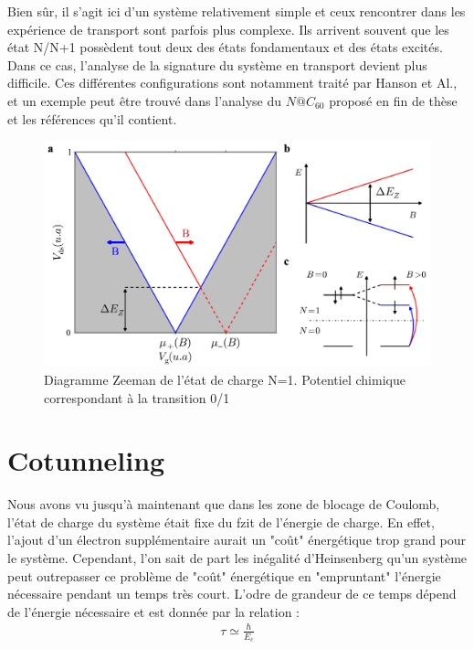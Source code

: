  Bien s\^ur, il s'agit ici d'un système relativement simple et ceux rencontrer dans les expérience de transport sont parfois plus complexe. Ils arrivent souvent que les état N/N+1 possèdent tout deux des états fondamentaux et des états excités. Dans ce cas, l'analyse de la signature du système en transport devient plus difficile. Ces différentes configurations sont notamment traité par Hanson et Al., et un exemple peut \^etre trouvé dans l'analyse du $N@C_{60}$ proposé en fin de thèse et les références qu'il contient.

\begin{figure}
\includegraphics[scale=0.5]{Theorie/Transport/figure4/figure4.pdf} 
\caption{Diagramme Zeeman de l'état de charge N=1. Potentiel chimique correspondant à la transition 0/1}
\label{charge_discharge}
\end{figure}

\section{Cotunneling}
Nous avons vu jusqu'à maintenant que dans les zone de blocage de Coulomb, l'état de charge du système était fixe du fzit de l'énergie de charge. En effet, l'ajout d'un électron supplémentaire aurait un "co\^ut" énergétique trop grand pour le système. Cependant, l'on sait de part les inégalité d'Heinsenberg qu'un système peut outrepasser ce problème de "co\^ut" énergétique en "empruntant" l'énergie nécessaire pendant un temps très court. L'odre de grandeur de ce temps dépend de l'énergie nécessaire et est donnée par la relation :
\begin{eqnarray}
\tau \simeq \frac{\hbar}{E_c} \nonumber
\end{eqnarray}


